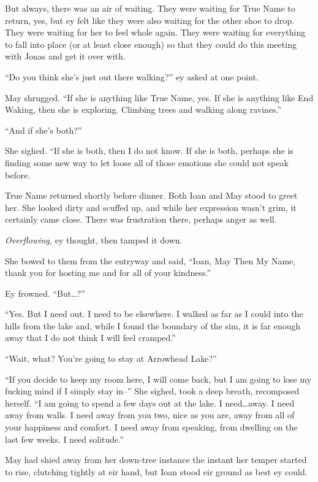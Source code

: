 But always, there was an air of waiting. They were waiting for True Name to return, yes, but ey felt like they were also waiting for the other shoe to drop. They were waiting for her to feel whole again. They were waiting for everything to fall into place (or at least close enough) so that they could do this meeting with Jonas and get it over with.

``Do you think she's just out there walking?'' ey asked at one point.

May shrugged. ``If she is anything like True Name, yes. If she is anything like End Waking, then she is exploring. Climbing trees and walking along ravines.''

``And if she's both?''

She sighed. ``If she is both, then I do not know. If she is both, perhaps she is finding some new way to let loose all of those emotions she could not speak before.

True Name returned shortly before dinner. Both Ioan and May stood to greet her. She looked dirty and scuffed up, and while her expression wasn't grim, it certainly came close. There was frustration there, perhaps anger as well.

\emph{Overflowing,} ey thought, then tamped it down.

She bowed to them from the entryway and said, ``Ioan, May Then My Name, thank you for hosting me and for all of your kindness.''

Ey frowned. ``But\ldots?''

``Yes. But I need out. I need to be elsewhere. I walked as far as I could into the hills from the lake and, while I found the boundary of the sim, it is far enough away that I do not think I will feel cramped.''

``Wait, what? You're going to stay at Arrowhead Lake?''

``If you decide to keep my room here, I will come back, but I am going to lose my fucking mind if I simply stay in--'' She sighed, took a deep breath, recomposed herself. ``I am going to spend a few days out at the lake. I need\ldots away. I need away from walls. I need away from you two, nice as you are, away from all of your happiness and comfort. I need away from speaking, from dwelling on the last few weeks. I need solitude.''

May had shied away from her down-tree instance the instant her temper started to rise, clutching tightly at eir hand, but Ioan stood eir ground as best ey could.

